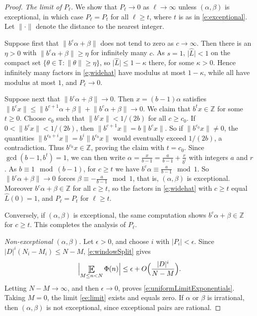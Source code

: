\begin{proof}
\smallskip 
\noindent\emph{The limit of $P_\ell$.} 
We show that $P_\ell \to 0$ as $\ell\to\infty$ unless $(\alpha,\beta)$ is exceptional, in which case $P_\ell=P_t$ for all $\ell\geq t$, where $t$ is as in \eqref{e:exceptional}. 
Let $\lVert\cdot\rVert$ denote the distance to the nearest integer. 

Suppose first that $\lVert b^c\alpha+\beta\rVert$ does not tend to zero as $c\to\infty$. 
Then there is an $\eta>0$ with $\lVert b^c\alpha+\beta\rVert\geq\eta$ for infinitely many $c$. 
As $s=1$, $\lvert\widehat L\rvert<1$ on the compact set $\{\theta\in\mathbb{T}\colon\lVert\theta\rVert\geq\eta\}$, so $\lvert\widehat L\rvert\leq 1-\kappa$ there, for some $\kappa>0$. 
Hence infinitely many factors in \eqref{e;widehat} have modulus at most $1-\kappa$, while all have modulus at most $1$, and $P_\ell\to0$. 

Suppose next that $\lVert b^c\alpha+\beta\rVert\to0$. 
Then $x=(b-1)\alpha$ satisfies $\lVert b^cx\rVert\leq \lVert b^{c+1}\alpha+\beta\rVert+\lVert b^c\alpha+\beta\rVert\to0$. 
We claim that $b^tx\in\mathbb{Z}$ for some $t\geq0$. 
Choose $c_0$ such that $\lVert b^cx\rVert<1/(2b)$ for all $c\geq c_0$. 
If $0<\lVert b^cx\rVert<1/(2b)$, then $\lVert b^{c+1}x\rVert=b\lVert b^cx\rVert$. 
So if $\lVert b^{c_0}x\rVert\neq0$, the quantities $\lVert b^{c_0+i}x\rVert=b^i\lVert b^{c_0}x\rVert$ would eventually exceed $1/(2b)$, a contradiction. 
Thus $b^{c_0}x\in\mathbb{Z}$, proving the claim with $t=c_0$. 
Since $\gcd(b-1,b^t)=1$, we can then write $\alpha=\frac{x}{b-1}=\frac{a}{b-1}+\frac{r}{b^t}$ with integers $a$ and $r$. 
As $b\equiv1\mod (b-1)$, for $c\geq t$ we have $b^c\alpha\equiv\frac{a}{b-1}\mod1$. 
So $\lVert b^c\alpha+\beta\rVert\to0$ forces $\beta\equiv-\frac a{b-1}\mod 1$, that is, $(\alpha,\beta)$ is exceptional. 
Moreover $b^c\alpha+\beta\in\mathbb{Z}$ for all $c\geq t$, so the factors in \eqref{e;widehat} with $c\geq t$ equal $\widehat L(0)=1$, and $P_\ell=P_t$ for $\ell\geq t$. 

Conversely, if $(\alpha,\beta)$ is exceptional, the same computation shows $b^c\alpha+\beta\in\mathbb{Z}$ for $c\geq t$. 
This completes the analysis of $P_\ell$. 

\smallskip 
\noindent\emph{Non-exceptional $(\alpha,\beta)$.} 
Let $\epsilon>0$, and choose $i$ with $\lvert P_i\rvert<\epsilon$. 
Since $\lvert D\rvert^i(N_i-M_i)\leq N-M$, \eqref{e:windowSplit} gives 
\begin{equation}
\Bigl\lvert\Expectation_{M\leq n<N}\Phi(n)\Bigr\rvert\leq \epsilon+O\Bigl(\frac{\lvert D\rvert^i}{N-M}\Bigr). 
\end{equation}
Letting $N-M\to\infty$, and then $\epsilon\to0$, proves \eqref{e:uniformLimitExponentials}. 
Taking $M=0$, the limit \eqref{ee:limit} exists and equals zero. 
If $\alpha$ or $\beta$ is irrational, then $(\alpha,\beta)$ is not exceptional, since exceptional pairs are rational. 


\end{proof}
